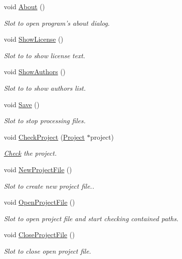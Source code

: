 \begin{DoxyCompactItemize}
void \hyperlink{class_main_window_acb789dac6a35383ad1d7bb6f652c7cee}{About} ()
\begin{DoxyCompactList}\small\item\em Slot to open program's about dialog. \end{DoxyCompactList}\item 
void \hyperlink{class_main_window_a09e054caab170ae90c452914c5c79be3}{Show\-License} ()
\begin{DoxyCompactList}\small\item\em Slot to to show license text. \end{DoxyCompactList}\item 
void \hyperlink{class_main_window_a03c505f24fe4bc85c17311ff41a38683}{Show\-Authors} ()
\begin{DoxyCompactList}\small\item\em Slot to to show authors list. \end{DoxyCompactList}\item 
void \hyperlink{class_main_window_aaa627b5bef0df35b757441ba3a527440}{Save} ()
\begin{DoxyCompactList}\small\item\em Slot to stop processing files. \end{DoxyCompactList}\item 
void \hyperlink{class_main_window_ab06dc13e63044e3374dc5ee6bbcf6b6a}{Check\-Project} (\hyperlink{class_project}{Project} $\ast$project)
\begin{DoxyCompactList}\small\item\em \hyperlink{class_check}{Check} the project. \end{DoxyCompactList}\item 
void \hyperlink{class_main_window_a215e21551a3e062c255a9d5260922d45}{New\-Project\-File} ()
\begin{DoxyCompactList}\small\item\em Slot to create new project file.. \end{DoxyCompactList}\item 
void \hyperlink{class_main_window_a1b6775cd6947c567505ebd66fc1896e8}{Open\-Project\-File} ()
\begin{DoxyCompactList}\small\item\em Slot to open project file and start checking contained paths. \end{DoxyCompactList}\item 
void \hyperlink{class_main_window_a6790ce8739be0afcc9220e1490bac1f9}{Close\-Project\-File} ()
\begin{DoxyCompactList}\small\item\em Slot to close open project file. \end{DoxyCompactList}\item 

\end{DoxyCompactItemize}
